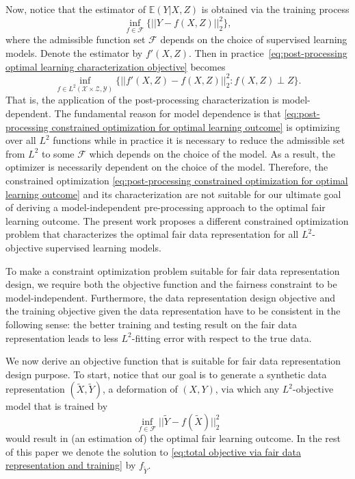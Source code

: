 \documentclass[twoside,11pt]{article}
\begin{document}
Now, notice that the estimator of $\mathbb{E}(Y|X,Z)$ is obtained via the training process
\begin{equation}
\inf_{f \in \mathcal{F}} \{||Y - f(X,Z)||_2^2\},
\end{equation}
where the admissible function set $\mathcal{F}$ depends on the choice of supervised learning models. Denote the estimator by $f'(X,Z)$. Then in practice~\eqref{eq:post-processing optimal learning characterization objective} becomes
\begin{equation} \label{eq:post-processing objective in practice}
\inf_{f \in L^2(\mathcal{X} \times \mathcal{Z},\mathcal{Y})} \{||f'(X,Z) - f(X,Z)||_2^2 : f(X,Z) \perp Z\}.
\end{equation}
That is, the application of the post-processing characterization is model-dependent. The fundamental reason for model dependence is that \eqref{eq:post-processing constrained optimization for optimal learning outcome} is optimizing over all $L^2$ functions while in practice it is necessary to reduce the admissible set from $L^2$ to some $\mathcal{F}$ which depends on the choice of the model. As a result, the optimizer is necessarily dependent on the choice of the model. Therefore, the constrained optimization \eqref{eq:post-processing constrained optimization for optimal learning outcome} and its characterization are not suitable for our ultimate goal of deriving a model-independent pre-processing approach to the optimal fair learning outcome. The present work proposes a different constrained optimization problem that characterizes the optimal fair data representation for all $L^2$-objective supervised learning models. 

To make a constraint optimization problem suitable for fair data representation design, we require both the objective function and the fairness constraint to be model-independent. Furthermore, the data representation design objective and the training objective given the data representation have to be consistent in the following sense: the better training and testing result on the fair data representation leads to less $L^2$-fitting error with respect to the true data.

We now derive an objective function that is suitable for fair data representation design purpose. To start, notice that our goal is to generate a synthetic data representation $(\tilde{X},\tilde{Y})$, a deformation of $(X,Y)$, via which any $L^2$-objective model that is trained by
\begin{equation} \label{eq:total objective via fair data representation and training}
\inf_{f \in \mathcal{F}} ||\tilde{Y} - f(\tilde{X})||^2_2
\end{equation}
would result in (an estimation of) the optimal fair learning outcome. In the rest of this paper we denote the solution to \eqref{eq:total objective via fair data representation and training} by $f_{\tilde{Y}}$.
\end{document}
